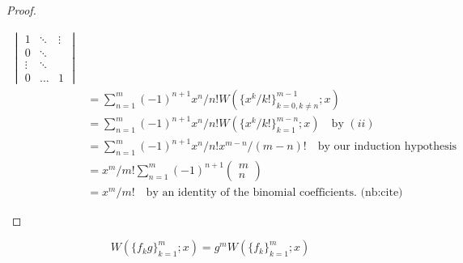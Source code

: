 \documentclass{book}
\begin{document}
\begin{proof}
\begin{description}
\begin{align*}
\begin{vmatrix}
1 & \ddots & \vdots \\
0 & \ddots & \\
\vdots & \ddots & \\
0 & \dots & 1
\end{vmatrix} \\
& = \sum_{n=1}^m (-1)^{n+1} x^n/n! W(\{x^k/k!\}_{k=0, k\neq n}^{m-1}; x) \\
& = \sum_{n=1}^m (-1)^{n+1} x^n/n! W(\{x^k/k!\}_{k=1}^{m-n}; x) \quad \text{by $(ii)$} \\
& = \sum_{n=1}^m (-1)^{n+1} x^n/n! x^{m-n}/(m-n)! \quad \text{by our induction hypothesis} \\
& = x^m/m! \sum_{n=1}^m (-1)^{n+1} \begin{pmatrix} m \\ n \end{pmatrix} \\
& = x^m/m! \quad \text{by an identity of the binomial coefficients. (nb:cite)}
\end{align*}
\end{description}
\end{proof}

\begin{lemma}
\begin{equation*}
W(\{ f_k g \}_{k=1}^m ; x) = g^m W(\{ f_k \}_{k=1}^m ; x )
\end{equation*}
\label{lem:group}
\end{lemma}
\end{document}
